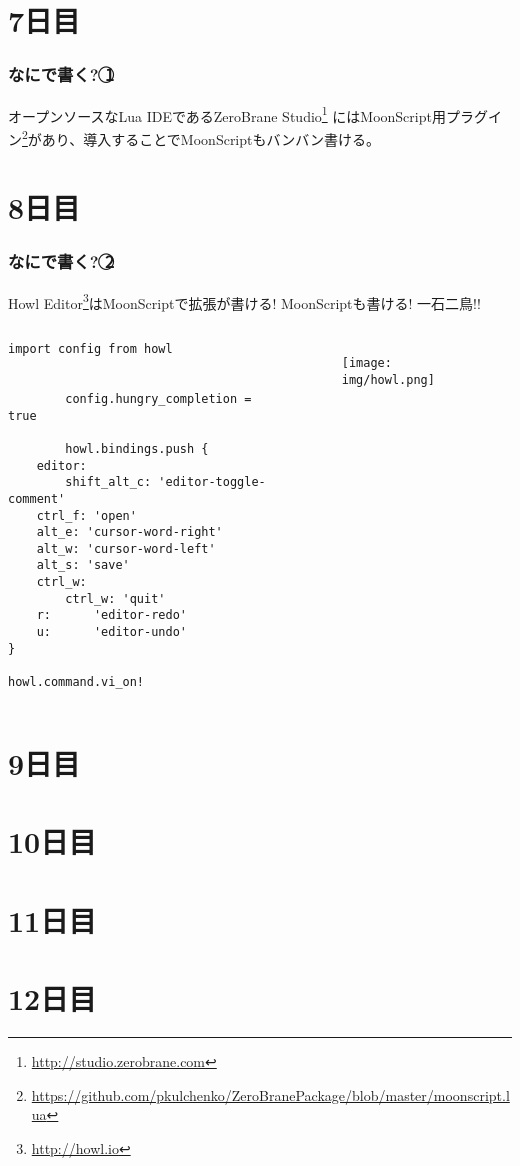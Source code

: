 \section{7日目}
\begin{frame}
	\frametitle{なにで書く? \textcircled{1}}
	オープンソースなLua IDEであるZeroBrane Studio\footnote[frame]{\url{http://studio.zerobrane.com}}%
	にはMoonScript用プラグイン\footnote[frame]{\url{https://github.com/pkulchenko/ZeroBranePackage/blob/master/moonscript.lua}}があり、導入することでMoonScriptもバンバン書ける。
\end{frame}

\section{8日目}
\begin{frame}[fragile]
	\frametitle{なにで書く? \textcircled{2}}
	Howl Editor\footnote[frame]{\url{http://howl.io}}はMoonScriptで拡張が書ける! MoonScriptも書ける! 一石二鳥!!

	\begin{columns}	
		\column[t]{.5\hsize}
		\tiny
		\begin{lstlisting}[numbers=none,language=MoonScript]
		import config from howl


		config.hungry_completion = true

		howl.bindings.push {
	editor:
		shift_alt_c: 'editor-toggle-comment'
	ctrl_f: 'open'
	alt_e: 'cursor-word-right'
	alt_w: 'cursor-word-left'
	alt_s: 'save'
	ctrl_w:
		ctrl_w: 'quit'
	r:      'editor-redo'
	u:      'editor-undo'
}

howl.command.vi_on!
	\end{lstlisting}
	\column[t]{.5\hsize}
	\begin{figure}[h]
		\centering
		\texttt{[image: img/howl.png]}
		\end{figure}
	\end{columns}
\end{frame}
\section{9日目}
\section{10日目}
\section{11日目}
\section{12日目}
